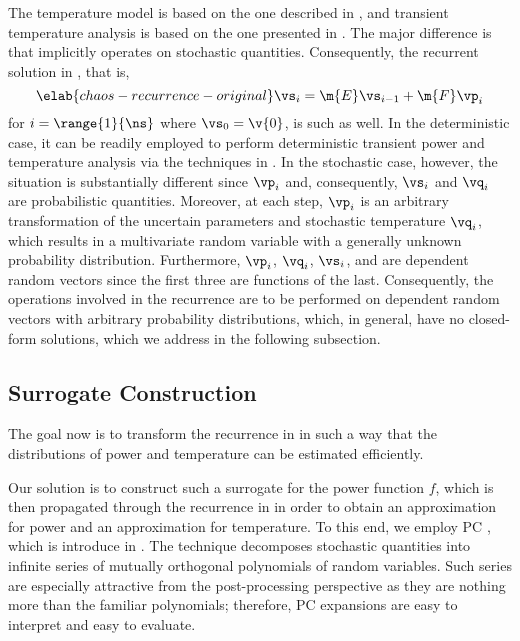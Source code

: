 The temperature model is based on the one described in ,
and transient temperature analysis is based on the one presented in
. The major difference is that
 implicitly operates on stochastic quantities.
Consequently, the recurrent solution in , that
is,
\begin{equation} \elab{chaos-recurrence-original}
  \vs_i = \m{E} \vs_{i - 1} + \m{F} \vp_i
\end{equation}
for $i = \range{1}{\ns}$ where $\vs_0 = \v{0}$, is such as well. In the
deterministic case, it can be readily employed to perform deterministic
transient power and temperature analysis via the techniques in
. In the stochastic case, however, the
situation is substantially different since $\vp_i$ and, consequently, $\vs_i$
and $\vq_i$ are probabilistic quantities. Moreover, at each step, $\vp_i$ is an
arbitrary transformation of the uncertain parameters \vu and stochastic
temperature $\vq_i$, which results in a multivariate random variable with a
generally unknown probability distribution. Furthermore, $\vp_i$, $\vq_i$,
$\vs_i$, and \vu are dependent random vectors since the first three are
functions of the last. Consequently, the operations involved in the recurrence
are to be performed on dependent random vectors with arbitrary probability
distributions, which, in general, have no closed-form solutions, which we
address in the following subsection.

\subsection{Surrogate Construction}

The goal now is to transform the recurrence in 
in such a way that the distributions of power and temperature can be estimated
efficiently.

Our solution is to construct such a surrogate for the power function $f$, which
is then propagated through the recurrence in  in
order to obtain an approximation for power and an approximation for temperature.
To this end, we employ \acf{PC} \cite{xiu2010}, which is introduce in
. The technique decomposes stochastic quantities into
infinite series of mutually orthogonal polynomials of random variables. Such
series are especially attractive from the post-processing perspective as they
are nothing more than the familiar polynomials; therefore, \ac{PC} expansions
are easy to interpret and easy to evaluate.

